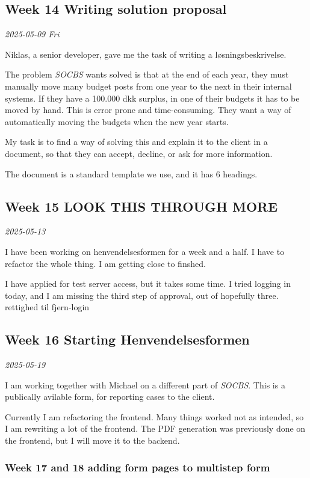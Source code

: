 \documentclass[../main.tex]{subfiles}
\begin{document}
\subsection{Week 14 Writing solution proposal}

\noindent \textit{2025-05-09 Fri}

Niklas, a senior developer, gave me the task of writing a løsningsbeskrivelse.

The problem \textit{SOCBS} wants solved is that at the end of each year, they must manually move many budget posts from one year to the next in their internal systems. If they have a 100.000 dkk surplus, in one of their budgets it has to be moved by hand.
This is error prone and time-consuming. They want a way of automatically moving the budgets when the new year starts.

My task is to find a way of solving this and explain it to the client in a document, so that they can accept, decline, or ask for more information.

The document is a standard template we use, and it has 6 headings.

\subsection{Week 15 LOOK THIS THROUGH MORE}
\noindent \textit{2025-05-13}

I have been working on henvendelsesformen for a week and a half. I have to refactor the whole thing. I am getting close to finshed.

I have applied for test server access, but it takes some time. I tried logging in today, and I am missing the third step of approval, out of hopefully three. rettighed til fjern-login

\subsection{Week 16 Starting Henvendelsesformen}

\noindent \textit{2025-05-19}

I am working together with Michael on a different part of \textit{SOCBS}. This is a publically avilable form, for reporting cases to the client. 

Currently I am refactoring the frontend. Many things worked not as intended, so I am rewriting a lot of the frontend. The PDF generation was previously done on the frontend, but I will move it to the backend.

\subsubsection{Week 17 and 18 adding form pages to multistep form}
\end{document}
